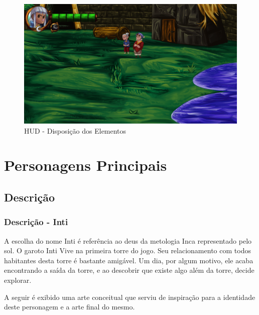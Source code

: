 \documentclass[12pt]{article}
\begin{document}
\begin{figure}[!htb]
    \centering
    \includegraphics[scale=0.38]{camera_hud_03.png}
    \caption{HUD - Disposição dos Elementos}
    \label{fig:camera_hud_03}
\end{figure}

\newpage

\section{Personagens Principais}
\subsection{Descrição}
\subsubsection{Descrição - Inti}
A escolha do nome Inti é referência ao deus da metologia Inca representado pelo
sol. O garoto Inti Vive na primeira torre do jogo. Seu relacionamento com todos
habitantes desta torre é bastante amigável. Um dia, por algum motivo, ele acaba
encontrando a saída da torre, e ao descobrir que existe algo além da torre,
decide explorar.

A seguir é exibido uma arte conceitual que serviu de inspiração para a identidade
deste personagem e a arte final do mesmo.
\end{document}
